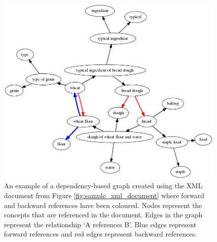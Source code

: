 \documentclass[12pt]{article}
\theoremstyle{grammarstyle}
\begin{document}

\begin{figure}
    \centering
    \includegraphics[width=\linewidth]{reports/technical_report/latex/figures/bread_graph-sections_only.png}
    \caption{An example of a dependency-based graph created using the XML document from Figure \ref{fig:sample_xml_document} where forward and backward references have been coloured. Nodes represent the concepts that are referenced in the document. Edges in the graph represent the relationship `A references B'. Blue edges represent forward references and red edges represent backward references.}
    \label{fig:graph_example-coloured_edges}
\end{figure}
\end{document}
